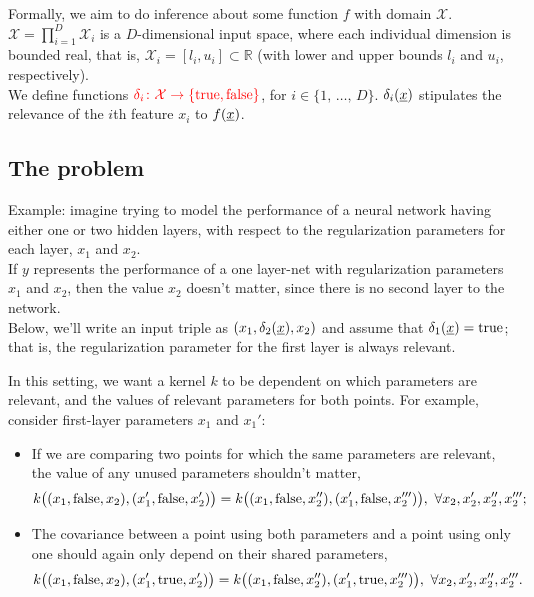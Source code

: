 \documentclass[landscape,a0b,final,a4resizeable]{include/a0poster}
\newcommand{\vect}[1]{\underline{\smash{#1}}}
\renewcommand{\v}[1]{\vect{#1}}
\newcommand{\reals}{\mathds{R}}
\newcommand{\sX}{\mathcal{X}}
\begin{document}
\begin{poster}
\begin{multicols}{3}
\vspace{0.5in}

Formally, we aim to do inference about some function $f$ with domain 
 $\sX$. $\sX = \prod_{i=1}^D \sX_i$ is a $D$-dimensional input space, where each individual dimension is bounded real, that is, $\sX_i = [l_i, u_i] \subset \reals$ (with lower and upper bounds $l_i$ and $u_i$, respectively).\\
We define functions $\textcolor{red}{\delta_i\colon \sX\to \{\text{true}, \text{false}\}}$, for $i \in \{1,\,\ldots,\,D\}$. $\delta_i(\v{x})$ stipulates the relevance of the $i$th feature $x_i$ to 
  $f(\v{x})$.



\subsection*{The problem}
\vspace{-0.05in}

Example: imagine trying to model the performance of a neural network having either one or two hidden layers, with respect to the regularization parameters for each layer, $x_1$ and $x_2$.\\ 
If $y$ represents the performance of a one layer-net with regularization parameters $x_1$ and $x_2$, then the value $x_2$ doesn't matter, since there is no second layer to the network.\\
Below, we'll write an input triple as $(x_1, \delta_2(\v{x}), x_2)$ and assume that $\delta_1(\v{x}) = \text{true}$; that is, the regularization parameter for the first layer is always relevant. 

In this setting, we want a kernel $k$ to be dependent on which parameters are relevant, and the values of relevant parameters for both points. For example, consider first-layer parameters $x_1$ and $x_1'$:
%
\begin{itemize}
\item If we are comparing two points for which the same parameters are relevant, the value of any unused parameters shouldn't matter,  
\begin{equation}
 k\bigl((x_1, \textnormal{false}, x_2), (x_1', \textnormal{false}, x_2') \bigr)
= k\bigl((x_1, \textnormal{false}, x_2''), (x_1', \textnormal{false}, x_2''')\bigr),\ 
\forall x_2, x_2', x_2'', x_2''';
\end{equation}
\item The covariance between a point using both parameters and a point using only one should again only depend on their shared parameters,
\begin{equation}
 k\bigl((x_1, \textnormal{false}, x_2), (x_1', \textnormal{true}, x_2') \bigr)
= k\bigl((x_1, \textnormal{false}, x_2''), (x_1', \textnormal{true}, x_2''')\bigr),\ 
\forall x_2, x_2', x_2'', x_2'''.
\end{equation}
\end{itemize}





\end{multicols}
\end{poster}
\end{document}
